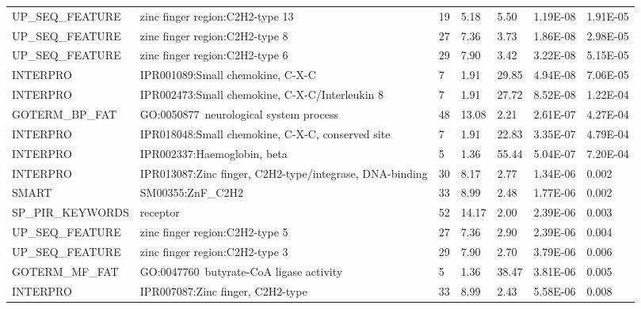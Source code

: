 \documentclass[a4paper,10pt,oneside]{book}
\begin{document}
{\begin{longtable}{lllllll}
UP\_SEQ\_FEATURE  & zinc finger region:C2H2-type 13                                 & 19    & 5.18  & 5.50            & 1.19E-08 & 1.91E-05 \\
UP\_SEQ\_FEATURE  & zinc finger region:C2H2-type 8                                  & 27    & 7.36  & 3.73            & 1.86E-08 & 2.98E-05 \\
UP\_SEQ\_FEATURE  & zinc finger region:C2H2-type 6                                  & 29    & 7.90  & 3.42            & 3.22E-08 & 5.15E-05 \\
INTERPRO          & IPR001089:Small chemokine, C-X-C                                & 7     & 1.91  & 29.85           & 4.94E-08 & 7.06E-05 \\
INTERPRO          & IPR002473:Small chemokine, C-X-C/Interleukin 8                  & 7     & 1.91  & 27.72           & 8.52E-08 & 1.22E-04 \\
GOTERM\_BP\_FAT   & GO:0050877~neurological system process                          & 48    & 13.08 & 2.21            & 2.61E-07 & 4.27E-04 \\
INTERPRO          & IPR018048:Small chemokine, C-X-C, conserved site                & 7     & 1.91  & 22.83           & 3.35E-07 & 4.79E-04 \\
INTERPRO          & IPR002337:Haemoglobin, beta                                     & 5     & 1.36  & 55.44           & 5.04E-07 & 7.20E-04 \\
INTERPRO          & IPR013087:Zinc finger, C2H2-type/integrase, DNA-binding         & 30    & 8.17  & 2.77            & 1.34E-06 & 0.002    \\
SMART             & SM00355:ZnF\_C2H2                                               & 33    & 8.99  & 2.48            & 1.77E-06 & 0.002    \\
SP\_PIR\_KEYWORDS & receptor                                                        & 52    & 14.17 & 2.00            & 2.39E-06 & 0.003    \\
UP\_SEQ\_FEATURE  & zinc finger region:C2H2-type 5                                  & 27    & 7.36  & 2.90            & 2.39E-06 & 0.004    \\
UP\_SEQ\_FEATURE  & zinc finger region:C2H2-type 3                                  & 29    & 7.90  & 2.70            & 3.79E-06 & 0.006    \\
GOTERM\_MF\_FAT   & GO:0047760~butyrate-CoA ligase activity                         & 5     & 1.36  & 38.47           & 3.81E-06 & 0.005    \\
INTERPRO          & IPR007087:Zinc finger, C2H2-type                                & 33    & 8.99  & 2.43            & 5.58E-06 & 0.008    \\

\end{longtable}}
\end{document}
